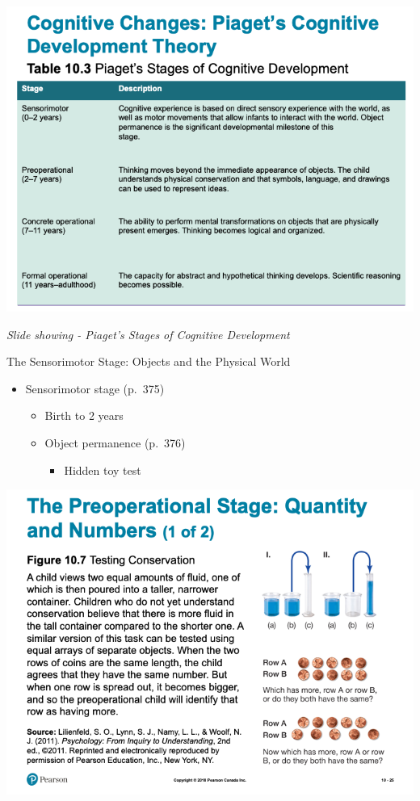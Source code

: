 \documentclass[
]{book}
\providecommand{\tightlist}{%
  \setlength{\itemsep}{0pt}\setlength{\parskip}{0pt}}
\begin{document}
\includegraphics{assets/unit_3/slide_23.png}

\emph{Slide showing - Piaget's Stages of Cognitive Development}

The Sensorimotor Stage: Objects and the Physical World

\begin{itemize}
\tightlist
\item
  Sensorimotor stage (p.~375)

  \begin{itemize}
  \tightlist
  \item
    Birth to 2 years
  \item
    Object permanence (p.~376)

    \begin{itemize}
    \tightlist
    \item
      Hidden toy test
    \end{itemize}
  \end{itemize}
\end{itemize}

\includegraphics{assets/unit_3/slide_25.png}
\end{document}
